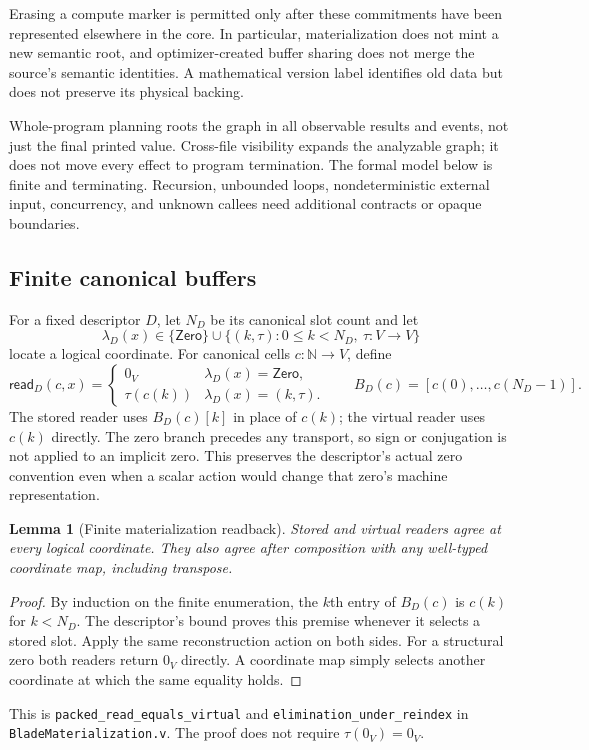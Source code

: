 \documentclass[11pt]{article}
\newtheorem{lemma}[theorem]{Lemma}
\newcommand{\Nat}{\mathbb N}
\begin{document}
Erasing a compute marker is permitted only after these commitments have been represented elsewhere in the core. In particular, materialization does not mint a new semantic root, and optimizer-created buffer sharing does not merge the source's semantic identities. A mathematical version label identifies old data but does not preserve its physical backing.

Whole-program planning roots the graph in all observable results and events, not just the final printed value. Cross-file visibility expands the analyzable graph; it does not move every effect to program termination. The formal model below is finite and terminating. Recursion, unbounded loops, nondeterministic external input, concurrency, and unknown callees need additional contracts or opaque boundaries.

\subsection{Finite canonical buffers}
For a fixed descriptor $D$, let $N_D$ be its canonical slot count and let
\[
 \lambda_D(x)\in\{\mathsf{Zero}\}\mathbin{\cup}
       \{(k,\tau):0\le k<N_D,\ \tau:V\to V\}
\]
locate a logical coordinate. For canonical cells $c:\Nat\to V$, define
\[
 \mathsf{read}_D(c,x)=
 \begin{cases}
 0_V & \lambda_D(x)=\mathsf{Zero},\\
 \tau(c(k)) & \lambda_D(x)=(k,\tau).
 \end{cases}
 \qquad
 B_D(c)=[c(0),\ldots,c(N_D-1)].
\]
The stored reader uses $B_D(c)[k]$ in place of $c(k)$; the virtual reader uses $c(k)$ directly. The zero branch precedes any transport, so sign or conjugation is not applied to an implicit zero. This preserves the descriptor's actual zero convention even when a scalar action would change that zero's machine representation.

\begin{lemma}[Finite materialization readback]
Stored and virtual readers agree at every logical coordinate. They also agree after composition with any well-typed coordinate map, including transpose.
\end{lemma}
\begin{proof}
By induction on the finite enumeration, the $k$th entry of $B_D(c)$ is $c(k)$ for $k<N_D$. The descriptor's bound proves this premise whenever it selects a stored slot. Apply the same reconstruction action on both sides. For a structural zero both readers return $0_V$ directly. A coordinate map simply selects another coordinate at which the same equality holds.
\end{proof}
This is \texttt{packed\_read\_equals\_virtual} and
\texttt{elimination\_under\_reindex} in \texttt{BladeMaterialization.v}.
The proof does not require $\tau(0_V)=0_V$.
\end{document}
